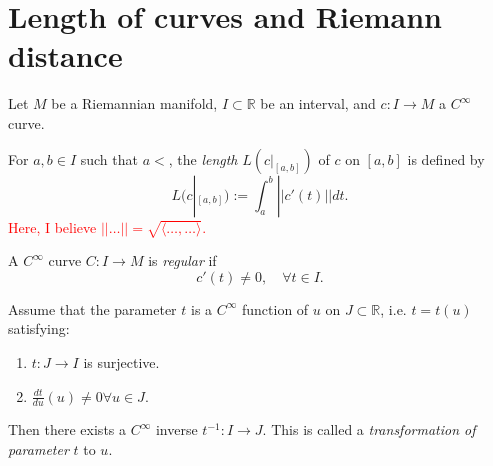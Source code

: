 \section{Length of curves and Riemann distance}

Let $M$ be a Riemannian manifold, $I \subset \mathbb{R}$ be an interval, and $c:I\to M$ a $C^{\infty}$ curve.
\begin{definition}\label{def:length_of_curve}
For $a,b\in I$ such that $a<$, the \emph{length} $L(c|_{[a,b]})$ of $c$ on $[a,b]$ is defined by
\[
L(c|_{[a,b]}) := \int^b_a ||c'(t)|| dt.
\]
\textcolor{red}{Here, I believe $||\dots|| = \sqrt{\langle \dots, \dots \rangle}$.}
\end{definition}

\begin{definition}
A $C^{\infty}$ curve $C:I\to M$ is \emph{regular} if
\[
c'(t) \neq 0, \quad \forall t \in I.
\]
\end{definition}

\begin{theorem} \label{thm:inverse_function_theorem}
Assume that the parameter $t$ is a $C^{\infty}$ function of $u$ on $J \subset \mathbb{R}$, i.e. $t = t(u)$ satisfying:
\begin{enumerate}
\item $t: J \to I$ is surjective.
\item $\frac{dt}{du}(u) \neq 0 \forall u \in J$.
\end{enumerate}
Then there exists a $C^{\infty}$ inverse $t^{-1}: I \to J$. This is called a \emph{transformation of parameter} $t$ to $u$.
\end{theorem}

